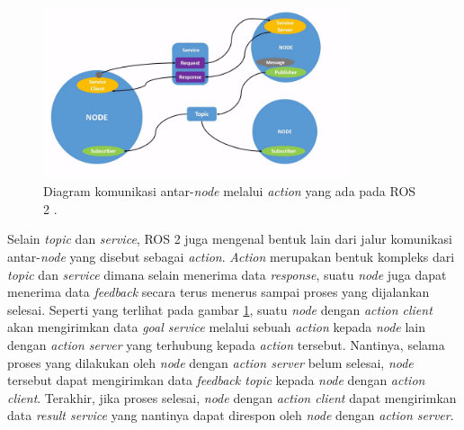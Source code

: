 \begin{figure}
  \centering
  \includegraphics[width=0.8\textwidth,keepaspectratio]{gambar/diagram-action-ros2.png}
  \caption{Diagram komunikasi antar-\emph{node} melalui \emph{action} yang ada pada ROS 2 \citep{url:understandingros2actions}.}
  \label{fig:diagramactionros2}
\end{figure}

Selain \emph{topic} dan \emph{service},
  ROS 2 juga mengenal bentuk lain dari jalur komunikasi antar-\emph{node} yang disebut sebagai \emph{action}.
\emph{Action} merupakan bentuk kompleks dari \emph{topic} dan \emph{service} dimana selain menerima data \emph{response},
  suatu \emph{node} juga dapat menerima data \emph{feedback} secara terus menerus sampai proses yang dijalankan selesai.
Seperti yang terlihat pada gambar \ref{fig:diagramactionros2},
  suatu \emph{node} dengan \emph{action client} akan mengirimkan data \emph{goal service} melalui sebuah \emph{action} kepada \emph{node} lain dengan \emph{action server} yang terhubung kepada \emph{action} tersebut.
Nantinya, selama proses yang dilakukan oleh \emph{node} dengan \emph{action server} belum selesai,
  \emph{node} tersebut dapat mengirimkan data \emph{feedback topic} kepada \emph{node} dengan \emph{action client}.
Terakhir, jika proses selesai, \emph{node} dengan \emph{action client} dapat mengirimkan data \emph{result service} yang nantinya dapat direspon oleh \emph{node} dengan \emph{action server}.
